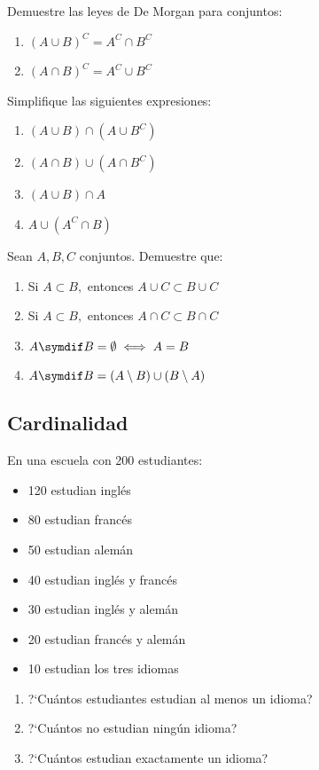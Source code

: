 \begin{problema}
	Demuestre las leyes de De Morgan para conjuntos:
	\begin{enumerate}
		\item $(A \cup B)^{C} = A^{C} \cap B^{C}$
		\item $(A \cap B)^{C} = A^{C} \cup B^{C}$
	\end{enumerate}
\end{problema}

\begin{problema}
	Simplifique las siguientes expresiones:
	\begin{enumerate}
		\item $(A \cup B) \cap (A \cup B^{C})$
		\item $(A \cap B) \cup (A \cap B^{C})$
		\item $(A \cup B) \cap A$
		\item $A \cup (A^{C} \cap B)$
	\end{enumerate}
\end{problema}

\begin{problema}
	Sean $A, B, C$ conjuntos. Demuestre que:
	\begin{enumerate}
		\item Si $A \subset B,$ entonces $A \cup C \subset B \cup C$
		\item Si $A \subset B,$ entonces $A \cap C \subset B \cap C$
		\item $A \symdif B = \emptyset \iff A = B$
		\item $A \symdif B = (A \setminus B) \cup (B \setminus A)$
	\end{enumerate}
\end{problema}

\subsection*{Cardinalidad}

\begin{problema}
	En una escuela con 200 estudiantes:
	\begin{itemize}
		\item 120 estudian inglés
		\item 80 estudian francés
		\item 50 estudian alemán
		\item 40 estudian inglés y francés
		\item 30 estudian inglés y alemán
		\item 20 estudian francés y alemán
		\item 10 estudian los tres idiomas
	\end{itemize}
	\begin{enumerate}
		\item ?`Cuántos estudiantes estudian al menos un idioma?
		\item ?`Cuántos no estudian ningún idioma?
		\item ?`Cuántos estudian exactamente un idioma?
	\end{enumerate}
\end{problema}

